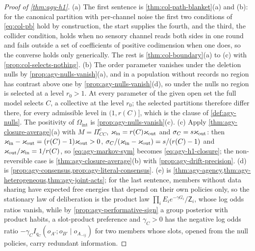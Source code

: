 \begin{proof}[Proof of \cref{thm:agy-h1}]
(a) The first sentence is \cref{thm:col-path-blanket}(a) and (b): for the canonical partition with per-channel noise the first two conditions of \eqref{eq:col-pb} hold by construction, the start supplies the fourth, and the third, the collider condition, holds when no sensory channel reads both sides in one round and fails outside a set of coefficients of positive codimension when one does, so the converse holds only generically. The rest is \cref{thm:col-boundary}(a) to (c) with \cref{prop:col-selects-nothing}. (b) The order parameter vanishes under the deletion nulls by \cref{prop:agy-nulls-vanish}(a), and in a population without records no region has contrast above one by \cref{prop:agy-nulls-vanish}(d), so under the nulls no region is selected at a level $r_0>1$. At every parameter of the given open set the full model selects $C$, a collective at the level $r_0$; the selected partitions therefore differ there, for every admissible level in $(1,r(C)]$, which is the clause of \cref{def:agy-nulls}. The positivity of $\Omega_{\mathrm{int}}$ is \cref{prop:agy-nulls-vanish}(c). (c) Apply \cref{thm:agy-closure-average}(a) with $M=\Pi^c_{CC}$, $\varkappa_{\mathrm{in}}=r(C)\varkappa_{\mathrm{out}}$ and $\sigma_C=s\varkappa_{\mathrm{out}}$: then $\varkappa_{\mathrm{in}}-\varkappa_{\mathrm{out}}=(r(C)-1)\varkappa_{\mathrm{out}}>0$, $\sigma_C/(\varkappa_{\mathrm{in}}-\varkappa_{\mathrm{out}})=s/(r(C)-1)$ and $\varkappa_{\mathrm{out}}/\varkappa_{\mathrm{in}}=1/r(C)$, so \eqref{eq:agy-markov-sym} becomes \eqref{eq:agy-h1-closure}; the non-reversible case is \cref{thm:agy-closure-average}(b) with \cref{prop:agy-drift-precision}. (d) is \cref{prop:agy-consensus,prop:agy-literal-consensus}. (e) is \cref{thm:agy-agency,thm:agy-heterogeneous,thm:agy-joint-acts}; for the last sentence, members without data sharing have expected free energies that depend on their own policies only, so the stationary law of deliberation is the product law $\prod_iE_ie^{-\gamma G_i}/\mathsf Z_i$, whose log odds ratios vanish, while by \cref{prop:agy-performative-sign} a group posterior with product habits, a slot-product preference and $\gamma_C>0$ has the negative log odds ratio $-\gamma_CI_{q_C}(o_{A'};o_{B'}\mid o_{A_{-ij}})$ for two members whose slots, opened from the null policies, carry redundant information.
\end{proof}
